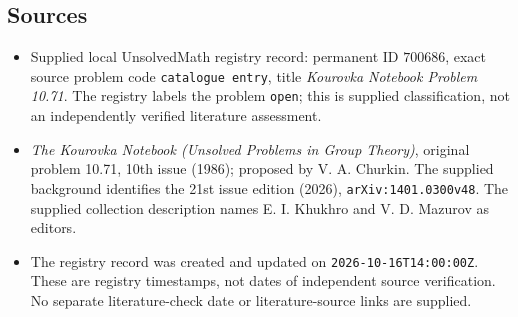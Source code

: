 \documentclass[11pt]{article}
\begin{document}
\subsection{Sources}
\begin{itemize}
\item Supplied local UnsolvedMath registry record: permanent ID \(700686\), exact source problem code \texttt{catalogue entry}, title \emph{Kourovka Notebook Problem 10.71}. The registry labels the problem \texttt{open}; this is supplied classification, not an independently verified literature assessment.
\item \emph{The Kourovka Notebook (Unsolved Problems in Group Theory)}, original problem 10.71, 10th issue (1986); proposed by V. A. Churkin. The supplied background identifies the 21st issue edition (2026), \texttt{arXiv:1401.0300v48}. The supplied collection description names E. I. Khukhro and V. D. Mazurov as editors.
\item The registry record was created and updated on \texttt{2026-10-16T14:00:00Z}. These are registry timestamps, not dates of independent source verification. No separate literature-check date or literature-source links are supplied.
\end{itemize}
\end{document}
